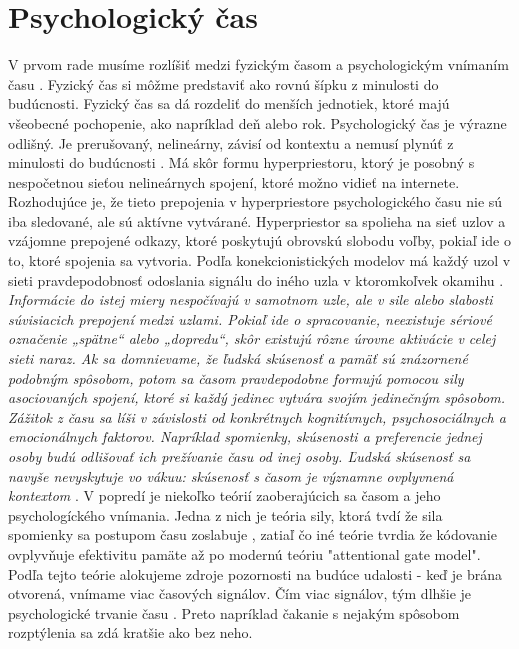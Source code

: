 \documentclass[10pt,twoside,slovak,a4paper]{article}
\begin{document}
\section{Psychologický čas}

V prvom rade musíme rozlíšiť medzi fyzickým časom a psychologickým vnímaním času \cite{zakay2012}. Fyzický čas si môžme predstaviť ako rovnú šípku z minulosti do budúcnosti. Fyzický čas sa dá rozdeliť do menších jednotiek, ktoré majú všeobecné pochopenie, ako napríklad deň alebo rok. Psychologický čas je výrazne odlišný. Je prerušovaný, nelineárny, závisí od kontextu a nemusí plynúť z minulosti do budúcnosti \cite{zakay2012}. Má skôr formu hyperpriestoru, ktorý je posobný s nespočetnou sieťou nelineárnych spojení, ktoré možno vidieť na internete. Rozhodujúce je, že tieto prepojenia v hyperpriestore psychologického času nie sú iba sledované, ale sú aktívne vytvárané. Hyperpriestor sa spolieha na sieť uzlov a vzájomne prepojené odkazy, ktoré poskytujú obrovskú slobodu voľby, pokiaľ ide o to, ktoré spojenia sa vytvoria. Podľa konekcionistických modelov má každý uzol v sieti pravdepodobnosť odoslania signálu do iného uzla v ktoromkoľvek okamihu \cite{rumelhart}. \textit{Informácie do istej miery nespočívajú v samotnom uzle, ale v sile alebo slabosti súvisiacich prepojení medzi uzlami. Pokiaľ ide o spracovanie, neexistuje sériové označenie „spätne“ alebo „dopredu“, skôr existujú rôzne úrovne aktivácie v celej sieti naraz. Ak sa domnievame, že ľudská skúsenosť a pamäť sú znázornené podobným spôsobom, potom sa časom pravdepodobne formujú pomocou sily asociovaných spojení, ktoré si každý jedinec vytvára svojím jedinečným spôsobom. Zážitok z času sa líši v závislosti od konkrétnych kognitívnych, psychosociálnych a emocionálnych faktorov. Napríklad spomienky, skúsenosti a preferencie jednej osoby budú odlišovať ich prežívanie času od inej osoby. Ľudská skúsenosť sa navyše nevyskytuje vo vákuu: skúsenosť s časom je významne ovplyvnená kontextom} \cite{10.2304/elea.2014.11.2.108}. V popredí je niekoľko teórií zaoberajúcich sa časom a jeho psychologíckého vnímania. Jedna z nich je teória sily, ktorá tvdí že sila spomienky sa postupom času zoslabuje \cite{hinrichs}, zatiaľ čo iné teórie tvrdia že kódovanie ovplyvňuje efektivitu pamäte \cite{murdock} až po modernú teóriu "attentional gate model". Podľa tejto teórie alokujeme zdroje pozornosti na budúce udalosti - keď je brána otvorená, vnímame viac časových signálov. Čím viac signálov, tým dlhšie je psychologické trvanie času \cite{zakay2000}. Preto napríklad čakanie s nejakým spôsobom rozptýlenia sa zdá kratšie ako bez neho.
\end{document}
